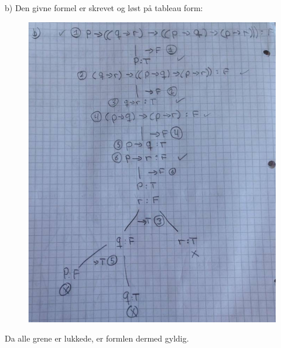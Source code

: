 b) Den givne formel er skrevet og løst på tableau form:

\begin{figure}[H]
    \centering
    \includegraphics[height=13 cm]{OpgA/tableauAb.pdf}
    \label{fig:Ab}
\end{figure}

Da alle grene er lukkede, er formlen dermed gyldig.